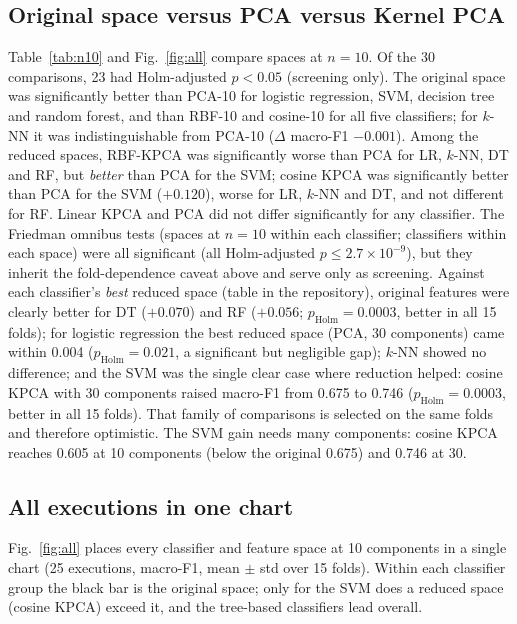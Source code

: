 \documentclass[runningheads]{llncs}
\begin{document}
\subsection{Original space versus PCA versus Kernel PCA}
Table~\ref{tab:n10} and Fig.~\ref{fig:all} compare spaces at $n=10$. Of the 30 comparisons, 23 had Holm-adjusted $p<0.05$ (screening only). The original space was significantly better than PCA-10 for logistic regression, SVM, decision tree and random forest, and than RBF-10 and cosine-10 for all five classifiers; for $k$-NN it was indistinguishable from PCA-10 ($\Delta$ macro-F1 $-0.001$). Among the reduced spaces, RBF-KPCA was significantly worse than PCA for LR, $k$-NN, DT and RF, but \emph{better} than PCA for the SVM; cosine KPCA was significantly better than PCA for the SVM ($+0.120$), worse for LR, $k$-NN and DT, and not different for RF. Linear KPCA and PCA did not differ significantly for any classifier. The Friedman omnibus tests (spaces at $n=10$ within each classifier; classifiers within each space) were all significant (all Holm-adjusted $p\le 2.7\times10^{-9}$), but they inherit the fold-dependence caveat above and serve only as screening. Against each classifier's \emph{best} reduced space (table in the repository), original features were clearly better for DT ($+0.070$) and RF ($+0.056$; $p_\mathrm{Holm}=0.0003$, better in all 15 folds); for logistic regression the best reduced space (PCA, 30 components) came within 0.004 ($p_\mathrm{Holm}=0.021$, a significant but negligible gap); $k$-NN showed no difference; and the SVM was the single clear case where reduction helped: cosine KPCA with 30 components raised macro-F1 from 0.675 to 0.746 ($p_\mathrm{Holm}=0.0003$, better in all 15 folds). That family of comparisons is selected on the same folds and therefore optimistic. The SVM gain needs many components: cosine KPCA reaches 0.605 at 10 components (below the original 0.675) and 0.746 at 30.

\begin{table}[htbp]
\caption{Accuracy / macro-F1 ($\pm$ std over 15 folds) at 10 components (original = 78 features), standard class weights.}\label{tab:n10}
\centering\scriptsize
\resizebox{\textwidth}{!}{}
\end{table}



\subsection{All executions in one chart}
Fig.~\ref{fig:all} places every classifier and feature space at 10 components in a single chart (25 executions, macro-F1, mean $\pm$ std over 15 folds). Within each classifier group the black bar is the original space; only for the SVM does a reduced space (cosine KPCA) exceed it, and the tree-based classifiers lead overall.
\end{document}
